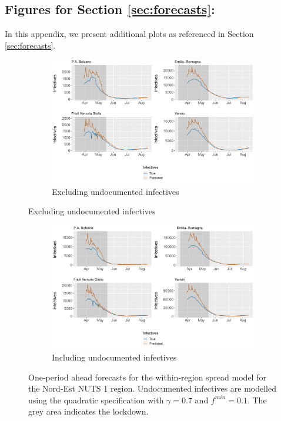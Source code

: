 \documentclass[12pt]{article}
\begin{document}
\begin{appendices}
		\newpage
		\subsection{Figures for Section \ref{sec:forecasts}: } \label{sapp:figures_forecasts}
		In this appendix, we present additional plots as referenced in Section \ref{sec:forecasts}.
		
		\begin{figure}[H]
    	    \centering
    	    \begin{subfigure}{\textwidth}
    	      \centering
    	      \includegraphics[width=0.85\linewidth]{output/model_within_lag14_forecast_start20_Nord-Est_rolling.pdf}
    	      \caption{Excluding undocumented infectives}
    	      \label{fig:forecast_within_nordest_regular}
    	    \end{subfigure}
        \end{figure}
        \begin{figure}[H]\ContinuedFloat
    	    \begin{subfigure}{\textwidth}
    	      \centering
    	      \includegraphics[width=0.85\linewidth]{output/model_within_lag14_forecast_start20_Nord-Est_UndocQuadratic_rolling.pdf}
    	      \caption{Including undocumented infectives}
    	      \label{fig:forecast_within_nordest_undoc}
    	    \end{subfigure}
    	    \caption{One-period ahead forecasts for the within-region spread model for the Nord-Est NUTS 1 region. Undocumented infectives are modelled using the quadratic specification with $\gamma = 0.7$ and $f^{min}=0.1$. The grey area indicates the lockdown.}
    	    \label{fig:forecast_within_nordest}
        \end{figure}
		

\end{appendices}
\end{document}
